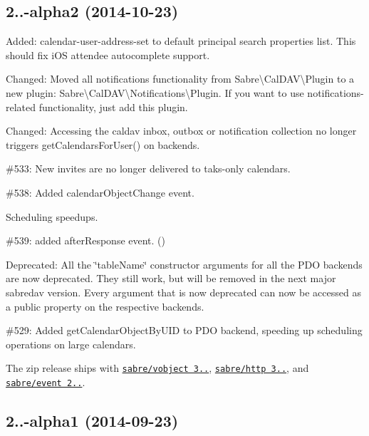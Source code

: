 \subsection*{2..-\/alpha2 (2014-\/10-\/23) }


\begin{DoxyItemize}
\item Added\+: calendar-\/user-\/address-\/set to default principal search properties list. This should fix i\+OS attendee autocomplete support.
\item Changed\+: Moved all \textquotesingle{}notifications\textquotesingle{} functionality from {\ttfamily Sabre\textbackslash{}Cal\+D\+AV\textbackslash{}Plugin} to a new plugin\+: {\ttfamily Sabre\textbackslash{}Cal\+D\+AV\textbackslash{}Notifications\textbackslash{}Plugin}. If you want to use notifications-\/related functionality, just add this plugin.
\item Changed\+: Accessing the caldav inbox, outbox or notification collection no longer triggers get\+Calendars\+For\+User() on backends.
\item \#533\+: New invites are no longer delivered to taks-\/only calendars.
\item \#538\+: Added {\ttfamily calendar\+Object\+Change} event.
\item Scheduling speedups.
\item \#539\+: added {\ttfamily after\+Response} event. ()
\item Deprecated\+: All the \char`\"{}table\+Name\char`\"{} constructor arguments for all the P\+DO backends are now deprecated. They still work, but will be removed in the next major sabredav version. Every argument that is now deprecated can now be accessed as a public property on the respective backends.
\item \#529\+: Added get\+Calendar\+Object\+By\+U\+ID to P\+DO backend, speeding up scheduling operations on large calendars.
\item The zip release ships with \href{http://sabre.io/vobject/}{\tt sabre/vobject 3..}, \href{http://sabre.io/http/}{\tt sabre/http 3..}, and \href{http://sabre.io/event/}{\tt sabre/event 2..}.
\end{DoxyItemize}

\subsection*{2..-\/alpha1 (2014-\/09-\/23) }


